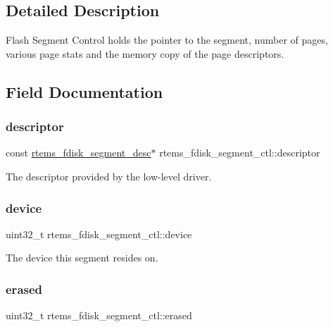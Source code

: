 \subsection{Detailed Description}
Flash Segment Control holds the pointer to the segment, number of pages, various page stats and the memory copy of the page descriptors. 

\subsection{Field Documentation}
\mbox{\label{structrtems__fdisk__segment__ctl_a1e69098549ae87b9e4558d07816772ec}} 
\subsubsection{\texorpdfstring{descriptor}{descriptor}}
{\footnotesize\ttfamily const \mbox{\hyperlink{structrtems__fdisk__segment__desc}{rtems\+\_\+fdisk\+\_\+segment\+\_\+desc}}$\ast$ rtems\+\_\+fdisk\+\_\+segment\+\_\+ctl\+::descriptor}

The descriptor provided by the low-\/level driver. \mbox{\label{structrtems__fdisk__segment__ctl_a96da4ef7d90aecf77f0dddb2284a5649}} 
\subsubsection{\texorpdfstring{device}{device}}
{\footnotesize\ttfamily uint32\+\_\+t rtems\+\_\+fdisk\+\_\+segment\+\_\+ctl\+::device}

The device this segment resides on. \mbox{\label{structrtems__fdisk__segment__ctl_a5b22866e2e133be895c98d47d9b19729}} 
\subsubsection{\texorpdfstring{erased}{erased}}
{\footnotesize\ttfamily uint32\+\_\+t rtems\+\_\+fdisk\+\_\+segment\+\_\+ctl\+::erased}

